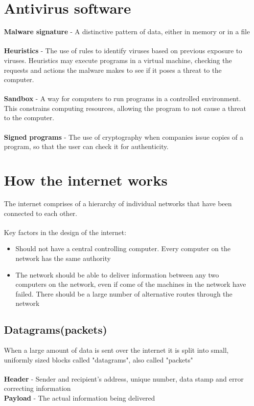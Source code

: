 \documentclass{article}[18pt]
\begin{document}
\section{Antivirus software}
\textbf{Malware signature} - A distinctive pattern of data, either in memory or in a file\\
\\
\textbf{Heuristics} - The use of rules to identify viruses based on previous exposure to viruses. Heuristics may execute programs in a virtual machine, checking the requests and actions the malware makes to see if it poses a threat to the computer.\\
\\
\textbf{Sandbox} - A way for computers to run programs in a controlled environment. This constrains computing resources, allowing the program to not cause a threat to the computer.\\
\\
\textbf{Signed programs} - The use of cryptography when companies issue copies of a program, so that the user can check it for authenticity.
\section{How the internet works}
The internet comprises of a hierarchy of individual networks that have been connected to each other.\\
\\
Key factors in the design of the internet:
\begin{itemize}
\item Should not have a central controlling computer. Every computer on the network has the same authority
\item The network should be able to deliver information between any two computers on the network, even if come of the machines in the network have failed. There should be a large number of alternative routes through the network
\end{itemize}
\subsection{Datagrams(packets)}
When a large amount of data is sent over the internet it is split into small, uniformly sized blocks called "datagrams", also called "packets"\\
\\
\textbf{Header} - Sender and recipient's address, unique number, data stamp and error correcting information\\
\textbf{Payload} - The actual information being delivered
\end{document}
